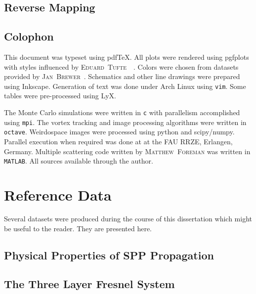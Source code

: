 \documentclass[a4paper,titlepage,onecolumn]{report}
\newcommand{\name}[1]{\textsc{#1}}
\begin{document}
\section{Reverse Mapping}




\section{Colophon}
This document was typeset using pdf\TeX. All plots were rendered using
pgfplots~\cite{feuersangerpgfplots} with styles influenced by
\name{Eduard~Tufte}~\cite{tufte1983visual}~\cite{tufte1991envisioning}.
Colors were chosen from datasets provided by
\name{Jan~Brewer}~\cite{harrower2003colorbrewer}.  Schematics and other
line drawings were prepared using Inkscape. Generation of text was done
under Arch Linux using \texttt{vim}.  Some tables were pre-processed using
LyX.

The Monte Carlo simulations were written in \texttt{c} with parallelism
accomplished using \texttt{mpi}. The vortex tracking and image processing
algorithms were written in \texttt{octave}.  Weirdospace images were
processed using python and scipy/numpy.  Parallel execution when required
was done at at the FAU RRZE, Erlangen, Germany.  Multiple scattering code
written by \name{Matthew~Foreman} was written in \texttt{MATLAB}.  All sources
available through the author.

\chapter{Reference Data}
Several datasets were produced during the course of this dissertation which
might be useful to the reader.  They are presented here.
\section{Physical Properties of SPP Propagation}
\label{ref:physicalproperties}
\section{The Three Layer Fresnel System}
\end{document}
